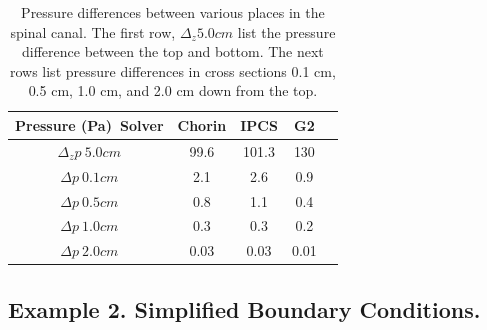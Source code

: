 \begin{table}
\begin{center}
\begin{tabular}{|c|c|c|c|c|} \hline
Pressure (Pa)\ Solver & Chorin & IPCS & G2 \\ \hline    
$\Delta_z p \ 5.0 cm$  & 99.6 & 101.3 & 130     \\ \hline    
$\Delta p  \ 0.1 cm$  &  2.1 & 2.6 & 0.9     \\ \hline    
$\Delta p  \ 0.5 cm$  & 0.8 & 1.1 & 0.4     \\ \hline    
$\Delta p  \ 1.0 cm$  & 0.3 & 0.3 & 0.2     \\ \hline    
$\Delta p  \ 2.0 cm$  &  0.03 & 0.03 & 0.01     \\ \hline    
\end{tabular}
\label{solvers:pressurediff}
\caption{Pressure differences between various places in the spinal canal. 
The first row, $\Delta_z 5.0 cm$ list the pressure difference between the top
and bottom. The next rows list pressure differences in cross sections 
0.1 cm, 0.5 cm, 1.0 cm, and 2.0 cm down from the top. }
\end{center}
\end{table}






\subsection{Example 2. Simplified Boundary Conditions.}

